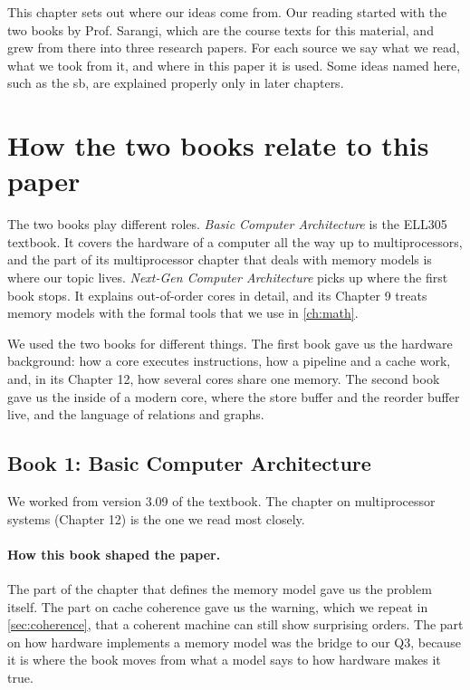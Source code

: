 This chapter sets out where our ideas come from. Our reading started with the two books by Prof. Sarangi, which are the course texts for this material, and grew from there into three research papers. For each source we say what we read, what we took from it, and where in this paper it is used. Some ideas named here, such as the \gls{sb}, are explained properly only in later chapters.

\section{How the two books relate to this paper}
\label{sec:books}

The two books play different roles. \emph{Basic Computer Architecture}\cite{sarangiBasic} is the ELL305 textbook. It covers the hardware of a computer all the way up to multiprocessors, and the part of its multiprocessor chapter that deals with memory models is where our topic lives. \emph{Next-Gen Computer Architecture}\cite{sarangiNextGen} picks up where the first book stops. It explains out-of-order cores in detail, and its Chapter 9 treats memory models with the formal tools that we use in \cref{ch:math}.

We used the two books for different things. The first book gave us the hardware background: how a core executes instructions, how a pipeline and a cache work, and, in its Chapter 12, how several cores share one memory. The second book gave us the inside of a modern core, where the store buffer and the reorder buffer live, and the language of relations and graphs.

\subsection{Book 1: Basic Computer Architecture}

We worked from version 3.09 of the textbook\cite{sarangiBasic}. The chapter on multiprocessor systems (Chapter 12) is the one we read most closely.

\paragraph{How this book shaped the paper.} The part of the chapter that defines the memory model gave us the problem itself. The part on cache coherence gave us the warning, which we repeat in \cref{sec:coherence}, that a coherent machine can still show surprising orders. The part on how hardware implements a memory model was the bridge to our Q3, because it is where the book moves from what a model says to how hardware makes it true.

